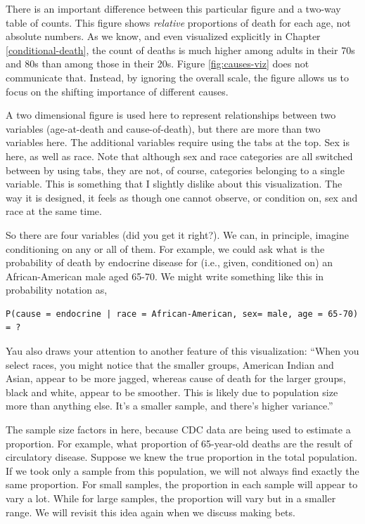 \documentclass[
  openany]{book}
\begin{document}
There is an important difference between this particular figure and a two-way table of counts. This figure shows \emph{relative} proportions of death for each age, not absolute numbers. As we know, and even visualized explicitly in Chapter \ref{conditional-death}, the count of deaths is much higher among adults in their 70s and 80s than among those in their 20s. Figure \ref{fig:causes-viz} does not communicate that. Instead, by ignoring the overall scale, the figure allows us to focus on the shifting importance of different causes.

A two dimensional figure is used here to represent relationships between two variables (age-at-death and cause-of-death), but there are more than two variables here. The additional variables require using the tabs at the top. Sex is here, as well as race. Note that although sex and race categories are all switched between by using tabs, they are not, of course, categories belonging to a single variable. This is something that I slightly dislike about this visualization. The way it is designed, it feels as though one cannot observe, or condition on, sex and race at the same time.

So there are four variables (did you get it right?). We can, in principle, imagine conditioning on any or all of them. For example, we could ask what is the probability of death by endocrine disease for (i.e., given, conditioned on) an African-American male aged 65-70. We might write something like this in probability notation as,

\begin{verbatim}
P(cause = endocrine | race = African-American, sex= male, age = 65-70) = ?
\end{verbatim}

Yau also draws your attention to another feature of this visualization: ``When you select races, you might notice that the smaller groups, American Indian and Asian, appear to be more jagged, whereas cause of death for the larger groups, black and white, appear to be smoother. This is likely due to population size more than anything else. It's a smaller sample, and there's higher variance.''

The sample size factors in here, because CDC data are being used to estimate a proportion. For example, what proportion of 65-year-old deaths are the result of circulatory disease. Suppose we knew the true proportion in the total population. If we took only a sample from this population, we will not always find exactly the same proportion. For small samples, the proportion in each sample will appear to vary a lot. While for large samples, the proportion will vary but in a smaller range. We will revisit this idea again when we discuss making bets.
\end{document}
